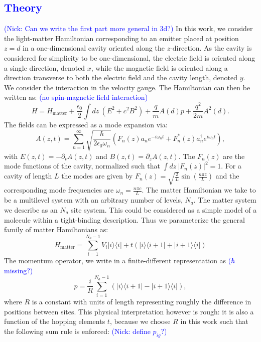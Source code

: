 \documentclass[aps,prb,twocolumn,
	groupedaddress,superscriptaddress,
	amsfonts,amssymb,amsmath,floatfix,
	citeautoscript]{revtex4-1}
\newcommand{\Jadd}[1]{\textcolor{blue}{#1}}
\begin{document}
\Jadd{\section{Theory}}
\label{sec:theory}
\Jadd{(Nick: Can we write the first part more general in 3d?)}
In this work, we consider the light-matter Hamiltonian corresponding to an emitter placed at position $z=d$ in a one-dimensional cavity oriented along the $z$-direction. As the cavity is considered for simplicity to be one-dimensional, the electric field is oriented along a single direction, denoted $x$, while the magnetic field is oriented along a direction transverse to both the electric field and the cavity length, denoted $y$. We consider the interaction in the velocity gauge. The Hamiltonian can then be written as: \Jadd{(no spin-magnetic field interaction)}
\begin{equation}
H = H_{\text{matter}}+\frac{\epsilon_0}{2}\int dz~(E^2+c^2B^2)+\frac{q}{m}A(d)p + \frac{q^2}{2m}A^2(d).
\end{equation}
The fields can be expressed as a mode expansion via:
\begin{equation}
A(z,t) = \sum\limits_{n=1}^{\infty} \sqrt{\frac{\hbar}{2\epsilon_0\omega_n }}(F_n(z)a_ne^{-i\omega_n t}+F^*_n(z)a_n^{\dagger}e^{i\omega_n t}),
\end{equation}
with $E(z,t) = -\partial_t A(z,t)$ and $B(z,t)=\partial_z A(z,t)$.  The $F_n(z)$ are the mode functions of the cavity, normalized such that $\int dz ~|F_n(z)|^2 = 1$. For a cavity of length $L$ the modes are given by $F_n(z) = \sqrt{\frac{2}{L}}\sin\left(\frac{n\pi z}{L} \right)$ and the corresponding mode frequencies are $\omega_n = \frac{n\pi c}{L}$. The matter Hamiltonian we take to be a multilevel system with an arbitrary number of levels, $N_a$. The matter system we describe as an $N_a$ site system. This could be considered as a simple model of a molecule within a tight-binding description. Thus we parameterize the general family of matter Hamiltonians as:
\begin{equation}
H_{\text{matter}} = \sum\limits_{i=1}^{{N_a-1}} V_i|i\rangle\langle i|+t(|i\rangle\langle i+1|+|i+1\rangle\langle i|) 
\end{equation}
The momentum operator, we write in a finite-different representation as
\Jadd{($\hbar$ missing?)}
\begin{equation}
p = \frac{i}{R}\sum\limits_{i=1}^{N_a-1} \left(|i\rangle\langle i+1|-|i+1\rangle\langle i| \right),
\end{equation}
where $R$ is a constant with units of length representing roughly the difference in positions between sites. This physical interpretation however is rough: it is also a function of the hopping elements $t$, because we choose $R$ in this work such that the following sum rule is enforced: \Jadd{(Nick: define $p_{ig}$?)}
\end{document}
